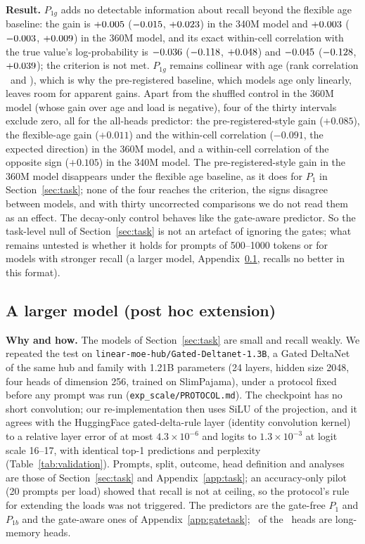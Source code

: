 \textbf{Result.} $P_{1g}$ adds no detectable information about recall beyond the flexible age baseline: the gain is $+0.005$ ($-0.015$, $+0.023$) in the 340M model and $+0.003$ ($-0.003$, $+0.009$) in the 360M model, and its exact within-cell correlation with the true value's log-probability is $-0.036$ ($-0.118$, $+0.048$) and $-0.045$ ($-0.128$, $+0.039$); the criterion is not met. $P_{1g}$ remains collinear with age (rank correlation \gCorrAgeA\ and \gCorrAgeB), which is why the pre-registered baseline, which models age only linearly, leaves room for apparent gains. Apart from the shuffled control in the 360M model (whose gain over age and load is negative), four of the thirty intervals exclude zero, all for the all-heads predictor: the pre-registered-style gain ($+0.085$), the flexible-age gain ($+0.011$) and the within-cell correlation ($-0.091$, the expected direction) in the 360M model, and a within-cell correlation of the opposite sign ($+0.105$) in the 340M model. The pre-registered-style gain in the 360M model disappears under the flexible age baseline, as it does for $P_1$ in Section~\ref{sec:task}; none of the four reaches the criterion, the signs disagree between models, and with thirty uncorrected comparisons we do not read them as an effect. The decay-only control behaves like the gate-aware predictor. So the task-level null of Section~\ref{sec:task} is not an artefact of ignoring the gates; what remains untested is whether it holds for prompts of 500--1000 tokens or for models with stronger recall (a larger model, Appendix~\ref{app:scale}, recalls no better in this format).

\subsection{A larger model (post hoc extension)}\label{app:scale}
\textbf{Why and how.} The models of Section~\ref{sec:task} are small and recall weakly. We repeated the test on \texttt{linear-moe-hub/Gated-Deltanet-1.3B}, a Gated DeltaNet of the same hub and family with 1.21B parameters (24 layers, hidden size 2048, four heads of dimension 256, trained on SlimPajama), under a protocol fixed before any prompt was run (\texttt{exp\_scale/PROTOCOL.md}). The checkpoint has no short convolution; our re-implementation then uses SiLU of the projection, and it agrees with the HuggingFace gated-delta-rule layer (identity convolution kernel) to a relative layer error of at most $4.3\times10^{-6}$ and logits to $1.3\times10^{-3}$ at logit scale 16--17, with identical top-1 predictions and perplexity (Table~\ref{tab:validation}). Prompts, split, outcome, head definition and analyses are those of Section~\ref{sec:task} and Appendix~\ref{app:task}; an accuracy-only pilot (20 prompts per load) showed that recall is not at ceiling, so the protocol's rule for extending the loads was not triggered. The predictors are the gate-free $P_1$ and $P_{1b}$ and the gate-aware ones of Appendix~\ref{app:gatetask}; \scLong\ of the \scHeads\ heads are long-memory heads.

